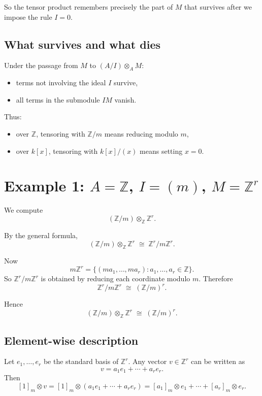 \documentclass[12pt,a4paper]{article}
\theoremstyle{plain}
\theoremstyle{definition}      %
\begin{document}
	So the tensor product remembers precisely the part of \(M\) that survives after we impose the rule \(I=0\).
	
	\subsection{What survives and what dies}
	
	Under the passage from \(M\) to \((A/I)\otimes_A M\):
	\begin{itemize}
		\item terms not involving the ideal \(I\) survive,
		\item all terms in the submodule \(IM\) vanish.
	\end{itemize}
	
	Thus:
	\begin{itemize}
		\item over \(\mathbb Z\), tensoring with \(\mathbb Z/m\) means reducing modulo \(m\),
		\item over \(k[x]\), tensoring with \(k[x]/(x)\) means setting \(x=0\).
	\end{itemize}
	
	\section{Example 1: \texorpdfstring{$A=\mathbb Z$, $I=(m)$, $M=\mathbb Z^r$}{A=Z, I=(m), M=Z\^r}}
	
	We compute
	\[
	(\mathbb Z/m)\otimes_{\mathbb Z}\mathbb Z^r.
	\]
	
	By the general formula,
	\[
	(\mathbb Z/m)\otimes_{\mathbb Z}\mathbb Z^r
	\;\cong\;
	\mathbb Z^r / m\mathbb Z^r.
	\]
	
	Now
	\[
	m\mathbb Z^r
	=
	\{(ma_1,\dots,ma_r): a_1,\dots,a_r\in\mathbb Z\}.
	\]
	So \(\mathbb Z^r/m\mathbb Z^r\) is obtained by reducing each coordinate modulo \(m\). Therefore
	\[
	\mathbb Z^r/m\mathbb Z^r \;\cong\; (\mathbb Z/m)^r.
	\]
	
	Hence
	\[
	(\mathbb Z/m)\otimes_{\mathbb Z}\mathbb Z^r \;\cong\; (\mathbb Z/m)^r.
	\]
	
	\subsection{Element-wise description}
	
	Let \(e_1,\dots,e_r\) be the standard basis of \(\mathbb Z^r\). Any vector \(v\in\mathbb Z^r\) can be written as
	\[
	v = a_1e_1+\cdots+a_re_r.
	\]
	Then
	\[
	[1]_m\otimes v
	=
	[1]_m\otimes(a_1e_1+\cdots+a_re_r)
	=
	[a_1]_m\otimes e_1+\cdots+[a_r]_m\otimes e_r.
	\]
	
\end{document}
